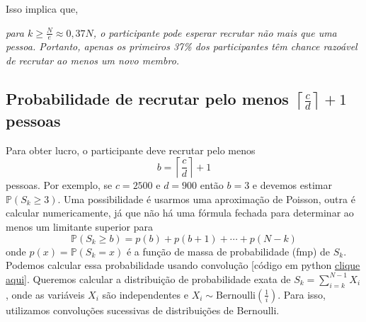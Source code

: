 \documentclass[a4paper,12pt]{article}
\begin{document}
Isso implica que,
\begin{center}
  \begin{minipage}[h]{.9\linewidth}
    \emph{para $k \geq \frac{N}{e} \approx 0{,}37N$, o participante
    pode esperar recrutar não mais que \emph{uma pessoa}. Portanto,
    apenas os primeiros 37\% dos participantes têm chance razoável de
    recrutar ao menos um novo membro.}\end{minipage}
\end{center}



\subsection*{Probabilidade de recrutar pelo menos
  $\left\lceil \frac{c}{d} \right\rceil + 1$ pessoas}

Para obter lucro, o participante deve recrutar pelo menos
\[
b = \left\lceil \frac{c}{d} \right\rceil + 1
\]
pessoas.  Por exemplo, se $c=2500$ e $d=900$ então $b=3$ e devemos
estimar \(\mathbb P(S_k \geq 3)\). Uma possibilidade é usarmos uma
aproximação de Poisson, outra é calcular numericamente, já que não há
uma fórmula fechada para determinar ao menos um limitante superior
para
\[
  \mathbb P(S_k \geq b) = p(b) + p(b+1)+\cdots+p(N-k)
\]
onde $p(x) = \mathbb P(S_k=x)$ é a função de massa de probabilidade (fmp) de
$S_k$. Podemos calcular essa probabilidade usando convolução [código em
python
\href{https://colab.research.google.com/drive/1ny7iBL4APXU2uY0w2B4Pfw0gVBnoZD3w#scrollTo=GRPo2NvLSWOe}{clique
  aqui}].  Queremos calcular a distribuição de probabilidade exata de
\( S_k = \sum_{i=k}^{N-1} X_i \), onde as variáveis \( X_i \) são
independentes e
\( X_i \sim \mathrm{Bernoulli}\left(\tfrac{1}{i}\right) \). Para isso,
utilizamos convoluções sucessivas de distribuições de Bernoulli.
\end{document}
